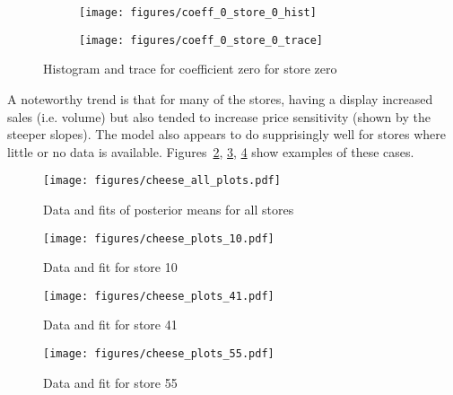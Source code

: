 \documentclass[11pt]{article}
\begin{document}
        \begin{figure}
            \begin{subfigure}{.5\textwidth}
              \centering
              \texttt{[image: figures/coeff\_0\_store\_0\_hist]}
            \end{subfigure}%
            \begin{subfigure}{.5\textwidth}
              \centering
              \texttt{[image: figures/coeff\_0\_store\_0\_trace]}
            \end{subfigure}
        \caption{Histogram and trace for coefficient zero for store zero}
        \end{figure}


    A noteworthy trend is that for many of the stores, having a display increased sales (i.e. volume) but also tended to increase price sensitivity (shown by the steeper slopes). The model also appears to do supprisingly well for stores where little or no data is available. Figures~\ref{fig:cheese_10}, \ref{fig:cheese_41}, \ref{fig:cheese_55} show examples of these cases.

    \begin{figure}[ht] 
      \centering 
      \texttt{[image: figures/cheese\_all\_plots.pdf]}
      \vskip-10pt
      \caption{\label{fig:all_cheese}Data and fits of posterior means for all stores}
    \end{figure}

    \begin{figure}[ht] 
      \centering 
      \texttt{[image: figures/cheese\_plots\_10.pdf]}
      \vskip-10pt
      \caption{\label{fig:cheese_10} Data and fit for store 10}
    \end{figure}

    \begin{figure}[ht] 
      \centering 
      \texttt{[image: figures/cheese\_plots\_41.pdf]}
      \vskip-10pt
      \caption{\label{fig:cheese_41} Data and fit for store 41}
    \end{figure}

    \begin{figure}[ht] 
      \centering 
      \texttt{[image: figures/cheese\_plots\_55.pdf]}
      \vskip-10pt
      \caption{\label{fig:cheese_55} Data and fit for store 55}
    \end{figure}

    \clearpage

    \appendix
\end{document}
